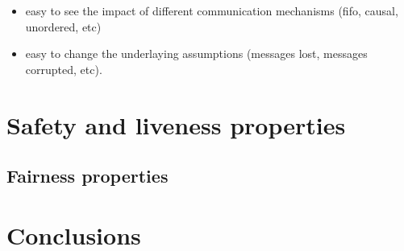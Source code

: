 \documentclass{llncs}
\begin{document}
\begin{itemize}
\item easy to see the impact of different communication mechanisms (fifo, causal, unordered, etc)
\item  easy to change the underlaying assumptions (messages lost, messages corrupted, etc).
\end{itemize}

\section{Safety and liveness properties}

\subsection{Fairness properties}


\section{Conclusions}



\end{document}
